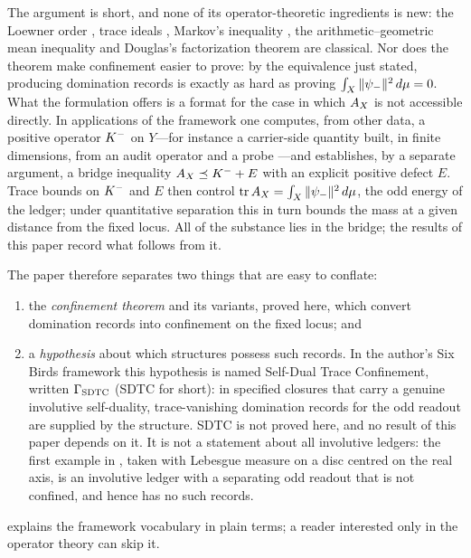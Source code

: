 The argument is short, and none of its operator-theoretic ingredients
is new: the Loewner order \citep{Loewner1934,Bhatia1997}, trace
ideals \citep{Simon2005}, Markov's inequality \citep{Folland1999},
the arithmetic--geometric mean inequality
\citep{HardyLittlewoodPolya1952} and Douglas's factorization theorem
\citep{Douglas1966} are classical.  Nor does the theorem make
confinement easier to prove: by the equivalence just stated, producing
domination records is exactly as hard as proving
\(\int_X\|\psi_{-}\|^2\,d\mu=0\).  What the formulation offers is a
format for the case in which \(A_{X}\) is not accessible directly.  In
applications of the framework one computes, from other data, a
positive operator \(K^{-}\) on \(Y\)---for instance a carrier-side
quantity built, in finite dimensions, from an audit operator and a
probe \citep{TsiokosNeedleKiller2026}---and establishes, by a separate
argument, a bridge inequality \(A_{X}\preceq K^{-}+E\) with an explicit
positive defect \(E\).  Trace bounds on \(K^{-}\) and \(E\) then
control \(\operatorname{tr}A_{X}=\int_X\|\psi_{-}\|^2\,d\mu\), the odd energy of the
ledger; under quantitative separation this in turn bounds the mass at
a given distance from the fixed locus.
All of the substance lies in the bridge; the results of this paper
record what follows from it.

The paper therefore separates two things that are easy to conflate:
\begin{enumerate}
  \item the \emph{confinement theorem} and its variants, proved here,
    which convert domination records into confinement on the fixed
    locus; and
  \item a \emph{hypothesis} about which structures possess such
    records.  In the author's Six Birds framework
    \citep{TsiokosFoundationsI2026} this hypothesis is named
    Self-Dual Trace Confinement, written \(\Gamma_{\mathrm{SDTC}}\) (SDTC for
    short): in specified closures that carry a genuine involutive
    self-duality, trace-vanishing domination records for the odd
    readout are supplied by the structure.  SDTC is not proved here,
    and no result of this paper depends on it.  It is not a
    statement about all involutive ledgers: the first example in
    , taken with Lebesgue measure on a
    disc centred on the real axis, is an involutive ledger with a
    separating odd readout that is not confined, and hence has no
    such records.
\end{enumerate}
 explains the framework vocabulary in plain
terms; a reader interested only in the operator theory can skip it.

